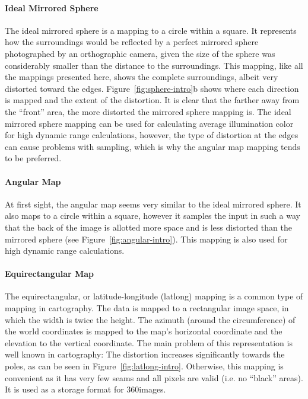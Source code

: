 \paragraph{Ideal Mirrored Sphere}
The ideal mirrored sphere is a mapping to a circle within a square. It represents how the surroundings would be reflected by a perfect mirrored sphere photographed by an orthographic camera, given the size of the sphere was considerably smaller than the distance to the surroundings. This mapping, like all the mappings presented here, shows the complete surroundings, albeit very distorted toward the edges. Figure~\ref{fig:sphere-intro}b shows where each direction is mapped and the extent of the distortion. It is clear that the farther away from the ``front'' area, the more distorted the mirrored sphere mapping is. The ideal mirrored sphere mapping can be used for calculating average illumination color for high dynamic range calculations, however, the type of distortion at the edges can cause problems with sampling, which is why the angular map mapping tends to be preferred.
\cite{hdrbook}

\paragraph{Angular Map}
At first sight, the angular map seems very similar to the ideal mirrored sphere. It also maps to a circle within a square, however it samples the input in such a way that the back of the image is allotted more space and is less distorted than the mirrored sphere (see Figure~\ref{fig:angular-intro}). This mapping is also used for high dynamic range calculations.

\paragraph{Equirectangular Map}
The equirectangular, or latitude-longitude (latlong) mapping is a common type of mapping in cartography. The data is mapped to a rectangular image space, in which the width is twice the height. The azimuth (around the circumference) of the world coordinates is mapped to the map's horizontal coordinate and the elevation to the vertical coordinate. The main problem of this representation is well known in cartography: The distortion increases significantly towards the poles, as can be seen in Figure~\ref{fig:latlong-intro}. Otherwise, this mapping is convenient as it has very few seams and all pixels are valid (i.e. no ``black'' areas). It is used as a storage format for 360\degree images.

